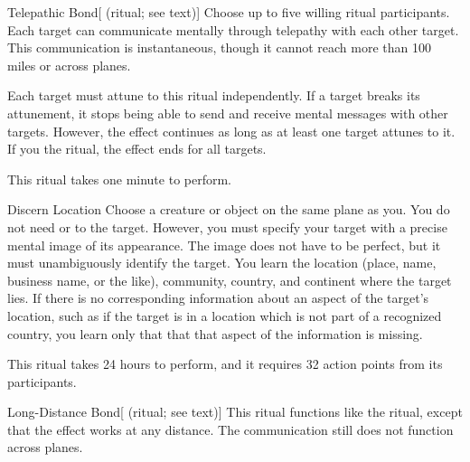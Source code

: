 \lowercase{\hypertarget{spell:Telepathic Bond}{}}\label{spell:Telepathic Bond}
\begin{attuneability}[\nth{3}]{\hypertarget{spell:Telepathic Bond}{Telepathic Bond}}[ (ritual; see text)]
Choose up to five willing ritual participants.
Each target can communicate mentally through telepathy with each other target.
This communication is instantaneous, though it cannot reach more than 100 miles or across planes.

Each target must attune to this ritual independently.
If a target breaks its attunement, it stops being able to send and receive mental messages with other targets.
However, the effect continues as long as at least one target attunes to it.
If you  the ritual, the effect ends for all targets.

This ritual takes one minute to perform.
\end{attuneability}
\vspace{0.25em}



\lowercase{\hypertarget{spell:Discern Location}{}}\label{spell:Discern Location}
\begin{freeability}[\nth{4}]{\hypertarget{spell:Discern Location}{Discern Location}}
Choose a creature or object on the same plane as you.
You do not need  or  to the target.
However, you must specify your target with a precise mental image of its appearance.
The image does not have to be perfect, but it must unambiguously identify the target.
You learn the location (place, name, business name, or the like), community, country, and continent where the target lies.
If there is no corresponding information about an aspect of the target's location, such as if the target is in a location which is not part of a recognized country,
you learn only that that that aspect of the information is missing.

This ritual takes 24 hours to perform, and it requires 32 action points from its participants.
\end{freeability}
\vspace{0.25em}



\lowercase{\hypertarget{spell:Long-Distance Bond}{}}\label{spell:Long-Distance Bond}
\begin{attuneability}[\nth{5}]{\hypertarget{spell:Long-Distance Bond}{Long-Distance Bond}}[ (ritual; see text)]
This ritual functions like the  ritual, except that the effect works at any distance.
The communication still does not function across planes.
\end{attuneability}
\vspace{0.25em}



